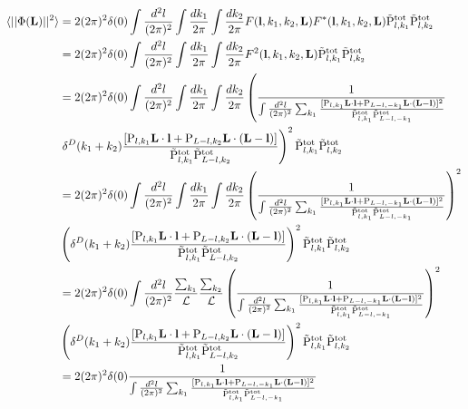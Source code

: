 \documentclass[12pt]{article}
\newcommand{\beq}{\begin{equation}}
\newcommand{\eeq}{\end{equation}}
\newcommand{\beqal}{\begin{aligned}}
\newcommand{\eeqal}{\end{aligned}}
\def\l{{\bf l}}
\def\L{{\bf L}}
\def\pul{{\rm P}}
\def\ptot{{\tilde{\rm P}^{\rm tot}}}
\def\d2l{\frac{d^2l}{(2\pi)^2}}
\def\dko{\frac{dk_1}{2\pi}}
\def\dkt{\frac{dk_2}{2\pi}}
\def\lbox{\mathcal{L}}
\numberwithin{equation}{section}
\begin{document}
\beq
\beqal
\langle ||\Phi(\L)||^2\rangle &= 2 (2\pi)^2 \delta(0) \int \d2l \int \dko \int
\dkt F(\l,k_1,k_2,\L) F^*(\l,k_1,k_2,\L) \ptot_{l,k_1}\ptot_{l,k_2} 
\\
&= 2 (2\pi)^2 \delta(0) \int \d2l \int \dko \int
\dkt F^2(\l,k_1,k_2,\L)\ptot_{l,k_1}\ptot_{l,k_2} 
\\
&= 2 (2\pi)^2 \delta(0)  \int \d2l \int \dko \int \dkt \left( \frac{1}{\int \frac{d^2 l}{(2\pi)^2} \sum_{k_1} \frac{[\pul_{l,k_1} \L\cdot \l +
		\pul_{L-l,-k_1} \L\cdot (\L-\l)]^2}{\ptot_{l,k_1}\ptot_{L-l,-k_1}} }   \right.
\\
& \left.	\delta^D(k_1+k_2) \frac{[\pul_{l,k_1} \L\cdot \l +
	\pul_{L-l,k_2} \L\cdot (\L-\l)]}{\ptot_{l,k_1}\ptot_{L-l,k_2}} \right)^2 \ptot_{l,k_1}\ptot_{l,k_2} 
\\
&=  2 (2\pi)^2\delta(0) \int \d2l \int \dko \int \dkt \left( \frac{1}{\int \frac{d^2 l}{(2\pi)^2} \sum_{k_1} \frac{[\pul_{l,k_1} \L\cdot \l +
		\pul_{L-l,-k_1} \L\cdot (\L-\l)]^2}{\ptot_{l,k_1}\ptot_{L-l,-k_1}} } \right)^2
\\
& \left(	\delta^D(k_1+k_2) \frac{[\pul_{l,k_1} \L\cdot \l +
	\pul_{L-l,k_2} \L\cdot (\L-\l)]}{\ptot_{l,k_1}\ptot_{L-l,k_2}} \right)^2 \ptot_{l,k_1}\ptot_{l,k_2} 
\\
&=  2 (2\pi)^2\delta(0) \int \d2l \frac{\sum_{k_1}}{\lbox} \frac{\sum_{k_2}}{\lbox} \left( \frac{1}{\int \frac{d^2 l}{(2\pi)^2} \sum_{k_1} \frac{[\pul_{l,k_1} \L\cdot \l +
		\pul_{L-l,-k_1} \L\cdot (\L-\l)]^2}{\ptot_{l,k_1}\ptot_{L-l,-k_1}} } \right)^2
\\
& \left(	\delta^D(k_1+k_2) \frac{[\pul_{l,k_1} \L\cdot \l +
	\pul_{L-l,k_2} \L\cdot (\L-\l)]}{\ptot_{l,k_1}\ptot_{L-l,k_2}} \right)^2 \ptot_{l,k_1}\ptot_{l,k_2} 
\\
	&=  2 (2\pi)^2\delta(0) \frac{1}{\int \frac{d^2 l}{(2\pi)^2} \sum_{k_1} \frac{[\pul_{l,k_1} \L\cdot \l +
		\pul_{L-l,-k_1} \L\cdot (\L-\l)]^2}{\ptot_{l,k_1}\ptot_{L-l,-k_1}} } 
\eeqal
\eeq
%
%
%
\end{document}
